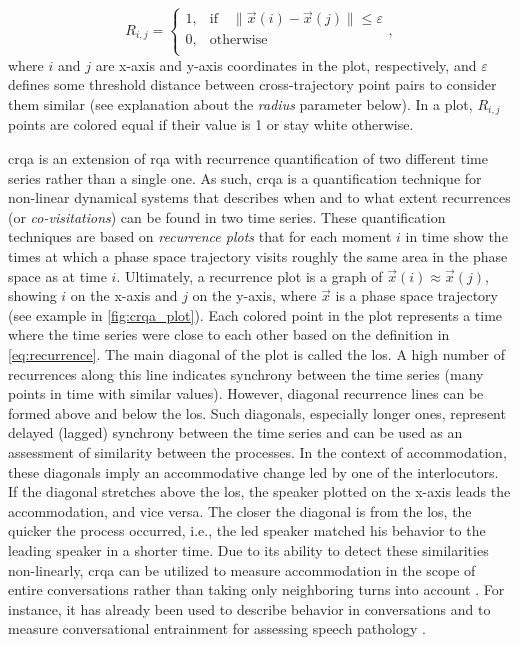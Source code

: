 \begin{equation}
\label{eq:recurrence}
R_{i,j} =
\begin{cases}
1,	&	\text{if} \quad \lVert \vec{x}(i)-\vec{x}(j) \rVert \leq \varepsilon \\
0,	&	\text{otherwise} \\
\end{cases},
\end{equation}
%
where $i$ and $j$ are x-axis and y-axis coordinates in the plot, respectively, and $\varepsilon$ defines some threshold distance between cross-trajectory point pairs to consider them similar (see explanation about the \emph{radius} parameter below).
In a plot, $R_{i,j}$ points are colored equal if their value is 1 or stay white otherwise.

\Ac{crqa} is an extension of \ac{rqa} with recurrence quantification of two different time series rather than a single one.
As such, \ac{crqa} is a quantification technique for non-linear dynamical systems that describes when and to what extent recurrences (or \emph{co-visitations}) can be found in two time series.
These quantification techniques are based on \emph{recurrence plots} that for each moment $i$ in time show the times at which a phase space trajectory visits roughly the same area in the phase space as at time $i$.
Ultimately, a recurrence plot is a graph of $\vec{x}(i) \approx \vec{x}(j)$, showing $i$ on the x-axis and $j$ on the y-axis, where $\vec{x}$ is a phase space trajectory (see example in \cref{fig:crqa_plot}).
Each colored point in the plot represents a time where the time series were close to each other based on the definition in \cref{eq:recurrence}.
The main diagonal of the plot is called the \acf{los}.
A high number of recurrences along this line indicates synchrony between the time series (many points in time with similar values).
However, diagonal recurrence lines can be formed above and below the \ac{los}.
Such diagonals, especially longer ones, represent delayed (lagged) synchrony between the time series and can be used as an assessment of similarity between the processes.
In the context of accommodation, these diagonals imply an accommodative change led by one of the interlocutors.
If the diagonal stretches above the \ac{los}, the speaker plotted on the x-axis leads the accommodation, and vice versa.
The closer the diagonal is from the \ac{los}, the quicker the process occurred, i.e., the led speaker matched his behavior to the leading speaker in a shorter time.
Due to its ability to detect these similarities non-linearly, \ac{crqa} can be utilized to measure accommodation in the scope of entire conversations rather than taking only neighboring turns into account \citep[cf.][]{Levitan2013entrainment}.
For instance, it has already been used to describe behavior in conversations \citep{Duran2017conversing} and to measure conversational entrainment for assessing speech pathology \citep{Borrie2019syncing}.

